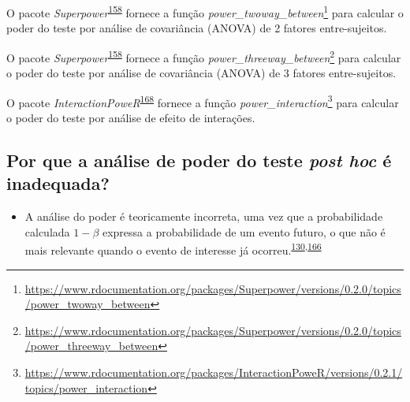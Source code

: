 \documentclass[
  a4paper,
]{book}
\providecommand{\tightlist}{%
  \setlength{\itemsep}{0pt}\setlength{\parskip}{0pt}}
\renewcommand{\href}[2]{#2\footnote{\url{#1}}}
\newenvironment{infobox}[1]
  {
  \begin{itemize}
  \renewcommand{\labelitemi}{
    \raisebox{-.7\height}[0pt][0pt]{
      {\setkeys{Gin}{width=3em,keepaspectratio}
        \texttt{[image: \#1]}}
    }
  }
  \setlength{\fboxsep}{1em}
  \begin{blackbox}
  \item
  }
  {
  \end{blackbox}
  \end{itemize}
  }
\begin{document}
\begin{infobox}{images/Rlogo}
O pacote \emph{Superpower}\textsuperscript{\protect\hyperlink{ref-Superpower}{158}} fornece a função \href{https://www.rdocumentation.org/packages/Superpower/versions/0.2.0/topics/power_twoway_between}{\emph{power\_twoway\_between}} para calcular o poder do teste por análise de covariância (ANOVA) de 2 fatores entre-sujeitos.

\end{infobox}

\begin{infobox}{images/Rlogo}
O pacote \emph{Superpower}\textsuperscript{\protect\hyperlink{ref-Superpower}{158}} fornece a função \href{https://www.rdocumentation.org/packages/Superpower/versions/0.2.0/topics/power_threeway_between}{\emph{power\_threeway\_between}} para calcular o poder do teste por análise de covariância (ANOVA) de 3 fatores entre-sujeitos.

\end{infobox}

\begin{infobox}{images/Rlogo}
O pacote \emph{InteractionPoweR}\textsuperscript{\protect\hyperlink{ref-InteractionPoweR}{168}} fornece a função \href{https://www.rdocumentation.org/packages/InteractionPoweR/versions/0.2.1/topics/power_interaction}{\emph{power\_interaction}} para calcular o poder do teste por análise de efeito de interações.

\end{infobox}

\hypertarget{por-que-a-anuxe1lise-de-poder-do-teste-post-hoc-uxe9-inadequada}{%
\subsection{\texorpdfstring{Por que a análise de poder do teste \emph{post hoc} é inadequada?}{Por que a análise de poder do teste post hoc é inadequada?}}\label{por-que-a-anuxe1lise-de-poder-do-teste-post-hoc-uxe9-inadequada}}

\begin{itemize}
\tightlist
\item
  A análise do poder é teoricamente incorreta, uma vez que a probabilidade calculada \(1-\beta\) expressa a probabilidade de um evento futuro, o que não é mais relevante quando o evento de interesse já ocorreu.\textsuperscript{\protect\hyperlink{ref-Cummings2003}{130},\protect\hyperlink{ref-heckman2022}{166}}
\end{itemize}
\end{document}
